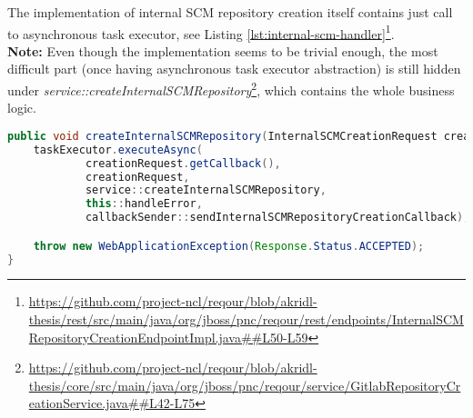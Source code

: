 \documentclass[../main.tex]{subfiles}
\begin{document}
The implementation of internal SCM repository creation itself contains just call to asynchronous task executor, see Listing \ref{lst:internal-scm-handler}\footnote{\url{https://github.com/project-ncl/reqour/blob/akridl-thesis/rest/src/main/java/org/jboss/pnc/reqour/rest/endpoints/InternalSCMRepositoryCreationEndpointImpl.java##L50-L59}}.\\
\textbf{Note:} Even though the implementation seems to be trivial enough, the most difficult part (once having asynchronous task executor abstraction) is still hidden under \textit{service::createInternalSCMRepository}\footnote{\url{https://github.com/project-ncl/reqour/blob/akridl-thesis/core/src/main/java/org/jboss/pnc/reqour/service/GitlabRepositoryCreationService.java##L42-L75}}, which contains the whole business logic.

\begin{lstlisting}[language=Java, caption=Internal SCM repository creation endpoint handler, label={lst:internal-scm-handler}]
public void createInternalSCMRepository(InternalSCMCreationRequest creationRequest) {
    taskExecutor.executeAsync(
            creationRequest.getCallback(),
            creationRequest,
            service::createInternalSCMRepository,
            this::handleError,
            callbackSender::sendInternalSCMRepositoryCreationCallback);

    throw new WebApplicationException(Response.Status.ACCEPTED);
}
\end{lstlisting}
\end{document}
